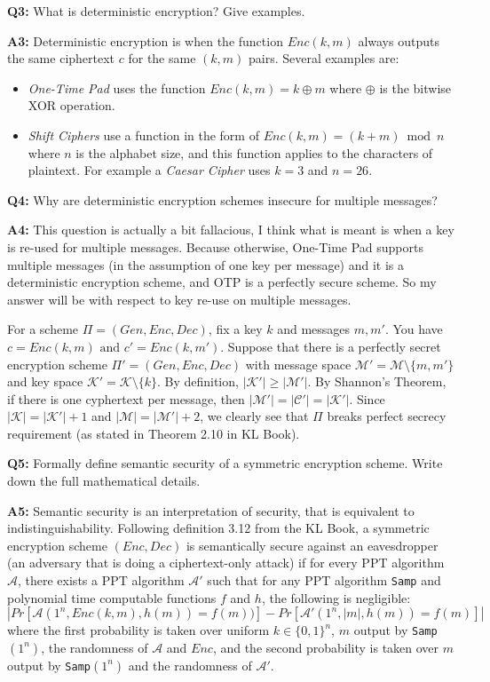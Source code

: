 \documentclass[12pt,reqno]{amsart}
\newcommand{\code}[1]{\texttt{#1}}
\newcommand{\mand}[0]{\text{ and }}
\newcommand{\msgspc}[0]{\mathcal{M}}
\newcommand{\cphspc}[0]{\mathcal{C}}
\newcommand{\keyspc}[0]{\mathcal{K}}
\newcommand{\advrs}[0]{\mathcal{A}}
\begin{document}
\vspace{20px}
\textbf{Q3:} What is deterministic encryption? Give examples.

\textbf{A3:} Deterministic encryption is when the function $Enc(k, m)$ always outputs the same ciphertext $c$ for the same $(k,m)$ pairs. Several examples are:
\begin{itemize}
	\item \textit{One-Time Pad} uses the function $Enc(k,m) = k \oplus m$ where $\oplus$ is the bitwise XOR operation.
	\item \textit{Shift Ciphers} use a function in the form of $Enc(k, m) = (k + m) \bmod{} n$ where $n$ is the alphabet size, and this function applies to the characters of plaintext. For example a \textit{Caesar Cipher} uses $k=3$ and $n=26$.
\end{itemize}

\vspace{20px}
\textbf{Q4:} Why are deterministic encryption schemes insecure for multiple messages?

\textbf{A4:} This question is actually a bit fallacious, I think what is meant is when a key is re-used for multiple messages. Because otherwise, One-Time Pad supports multiple messages (in the assumption of one key per message) and it is a deterministic encryption scheme, and OTP is a perfectly secure scheme. So my answer will be with respect to key re-use on multiple messages.

For a scheme $\Pi=(Gen,Enc,Dec)$, fix a key $k$ and messages $m, m'$. You have $c=Enc(k,m) \mand c'=Enc(k,m')$. Suppose that there is a perfectly secret encryption scheme $\Pi' = (Gen, Enc, Dec)$ with message space $\msgspc' = \msgspc \setminus \{m, m'\}$ and key space $\keyspc' = \keyspc \setminus \{k\}$. By definition, $|\keyspc'|\geq|\msgspc'|$. By Shannon's Theorem, if there is one cyphertext per message, then $|\msgspc'|=|\cphspc'|=|\keyspc'|$. Since $|\keyspc|=|\keyspc'|+1$ and $|\msgspc|=|\msgspc'|+2$, we clearly see that $\Pi$ breaks perfect secrecy requirement (as stated in Theorem 2.10 in KL Book).

\vspace{20px}
\textbf{Q5:} Formally define semantic security of a symmetric encryption scheme. Write down the full mathematical details.

\textbf{A5:} Semantic security is an interpretation of security, that is equivalent to indistinguishability. Following definition 3.12 from the KL Book, a symmetric encryption scheme $(Enc,Dec)$ is semantically secure against an eavesdropper (an adversary that is doing a ciphertext-only attack) if for every PPT algorithm $\advrs$, there exists a PPT algorithm $\advrs'$ such that for any PPT algorithm \code{Samp} and polynomial time computable functions $f$ and $h$, the following is negligible:
$$
|Pr[\advrs(1^n, Enc(k,m),h(m))=f(m))]-Pr[\advrs'(1^n,|m|,h(m))=f(m)]|
$$
where the first probability is taken over uniform $k \in \{0,1\}^n$, $m$ output by \code{Samp}$(1^n)$, the randomness of $\advrs$ and $Enc$, and the second probability is taken over $m$ output by \code{Samp}$(1^n)$ and the randomness of $\advrs'$.
\end{document}

